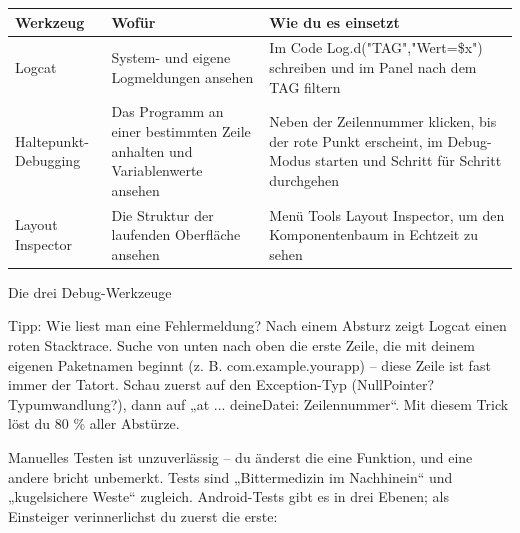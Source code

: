 


\begin{center}
\begin{tabularx}{\linewidth}{|X|X|X|}
\hline
\textbf{Werkzeug} & \textbf{Wofür} & \textbf{Wie du es einsetzt} \tabularnewline
\hline
Logcat & System- und eigene Logmeldungen ansehen & Im Code Log.d("TAG","Wert=\$x") schreiben und im Panel nach dem TAG filtern \tabularnewline
Haltepunkt-Debugging & Das Programm an einer bestimmten Zeile anhalten und Variablenwerte ansehen & Neben der Zeilennummer klicken, bis der rote Punkt erscheint, im Debug-Modus starten und Schritt für Schritt durchgehen \tabularnewline
Layout Inspector & Die Struktur der laufenden Oberfläche ansehen & Menü Tools Layout Inspector, um den Komponentenbaum in Echtzeit zu sehen \tabularnewline
\hline
\end{tabularx}
\end{center}

\begin{center}\small\color{gray}Die drei Debug-Werkzeuge\end{center}

\begin{tcbinfo}{Tipp: Wie liest man eine Fehlermeldung?}
Nach einem Absturz zeigt Logcat einen roten Stacktrace. Suche von unten nach oben die erste Zeile, die mit deinem eigenen Paketnamen beginnt (z. B. com.example.yourapp) – diese Zeile ist fast immer der Tatort. Schau zuerst auf den Exception-Typ (NullPointer? Typumwandlung?), dann auf „at ... deineDatei: Zeilennummer“. Mit diesem Trick löst du 80 \% aller Abstürze.

\end{tcbinfo}


Manuelles Testen ist unzuverlässig – du änderst die eine Funktion, und eine andere bricht unbemerkt. Tests sind „Bittermedizin im Nachhinein“ und „kugelsichere Weste“ zugleich. Android-Tests gibt es in drei Ebenen; als Einsteiger verinnerlichst du zuerst die erste:

